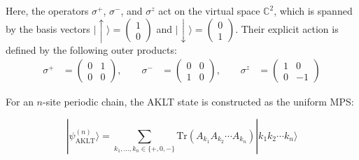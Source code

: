 \documentclass[12pt,a4paper]{article}
\begin{document}
Here, the operators $\sigma^+$, $\sigma^-$, and $\sigma^z$ act on the virtual space $\mathbb{C}^2$, which is spanned by the basis vectors $|\uparrow\rangle = \begin{pmatrix} 1 \\ 0 \end{pmatrix}$ and $|\downarrow\rangle = \begin{pmatrix} 0 \\ 1 \end{pmatrix}$. Their explicit action is defined by the following outer products:
\begin{equation*}
\begin{aligned}
\sigma^+ &=   \begin{pmatrix} 0 & 1 \\ 0 & 0 \end{pmatrix}, \qquad
\sigma^- &=  \begin{pmatrix} 0 & 0 \\ 1 & 0 \end{pmatrix}, \qquad
\sigma^z &=   \begin{pmatrix} 1 & 0 \\ 0 & -1 \end{pmatrix}
\end{aligned}
\end{equation*}

For an $n$-site periodic chain, the AKLT state is constructed as the uniform MPS:

\begin{equation}\label{eqAKLT}
|\psi_{\mathrm{AKLT}}^{(n)}\rangle = \sum_{k_1,\dots,k_n \in \{+,0,-\}} \mathrm{Tr}\left(A_{k_1} A_{k_2} \cdots A_{k_n}\right) |k_1 k_2 \cdots k_n\rangle
\end{equation}
\end{document}
